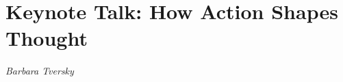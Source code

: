 \documentclass[../booklet.tex]{subfiles}
\begin{document}
\section[Keynote Talk: How Action Shapes Thought. {\it Barbara Tversky}]{Keynote Talk: How Action Shapes Thought}

\begin{center}
  {\it Barbara Tversky}
\end{center}

\vskip 0.8cm


% 
\end{document}
